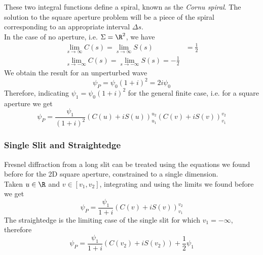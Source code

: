 \documentclass[../electromagnetism.tex]{subfiles}
\begin{document}
These two integral functions define a spiral, known as the \textit{Cornu spiral}. The solution to the square aperture problem will be a piece of the spiral corresponding to an appropriate interval $\Delta s$.\\
In the case of no aperture, i.e. $\Sigma=\R^2$, we have
\begin{equation}
	\begin{aligned}
		\lim_{s\to\infty}C(s)=\lim_{s\to\infty}S(s)&= \frac{1}{2}\\
		\lim_{s\to-\infty}C(s)=\lim_{s\to-\infty}S(s)=-\frac{1}{2}
	\end{aligned}
	\label{eq:limitscornu.diff}
\end{equation}
We obtain the result for an unperturbed wave
\begin{equation}
	\psi_P=\psi_0\left( 1+i \right)^2=2i\psi_0
	\label{eq:unperturbedsquarefresnel.diff}
\end{equation}
Therefore, indicating $\psi_1=\psi_0\left( 1+i \right)^2$ for the general finite case, i.e. for a square aperture we get
\begin{equation}
	\psi_P=\frac{\psi_1}{\left( 1+i \right)^2}\left( C(u)+iS(u) \right)_{u_1}^{u_2}\left( C(v)+iS(v) \right)^{v_2}_{v_1}
	\label{eq:fresnelsquare.diff}
\end{equation}
\subsubsection{Single Slit and Straightedge}
Fresnel diffraction from a long slit can be treated using the equations we found before for the 2D square aperture, constrained to a single dimension.\\
Taken $u\in\R$ and $v\in[v_1, v_2]$, integrating and using the limits we found before we get
\begin{equation}
	\psi_P=\frac{\psi_1}{1+i}\left( C(v)+iS(v) \right)_{v_1}^{v_2}
	\label{eq:fresnelsingleslit}
\end{equation}
The straightedge is the limiting case of the single slit for which $v_1=-\infty$, therefore
\begin{equation}
	\psi_P=\frac{\psi_1}{1+i}\left( C(v_2)+iS(v_2) \right)+\frac{1}{2}\psi_1
	\label{eq:straighthedgefresnel.diff}
\end{equation}
\end{document}
